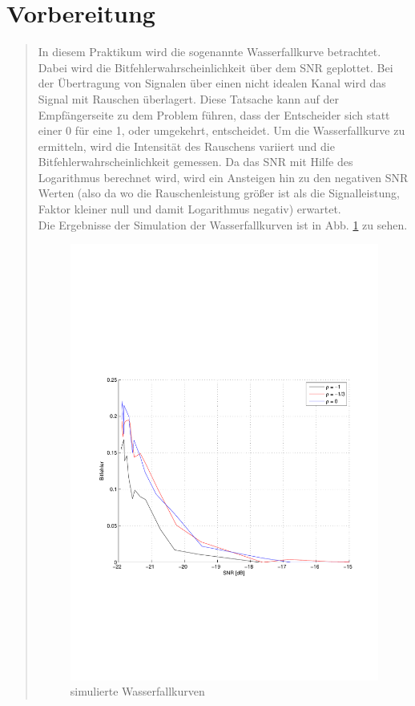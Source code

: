 \section{Vorbereitung}
\begin{quote}
       In diesem Praktikum wird die sogenannte Wasserfallkurve betrachtet. Dabei wird die Bitfehlerwahrscheinlichkeit
       über dem SNR geplottet. Bei der Übertragung von Signalen über einen nicht idealen Kanal wird das Signal mit
       Rauschen überlagert. Diese Tatsache kann auf der Empfängerseite zu dem Problem führen, dass der Entscheider sich
       statt einer 0 für eine 1, oder umgekehrt, entscheidet. Um die Wasserfallkurve zu ermitteln, wird die
       Intensität des Rauschens variiert und die Bitfehlerwahrscheinlichkeit gemessen.
       Da das SNR mit Hilfe des Logarithmus berechnet wird, wird ein Ansteigen hin zu den negativen SNR Werten (also da wo die Rauschenleistung größer ist als die Signalleistung, Faktor kleiner null und damit Logarithmus
       negativ) erwartet. \\
       Die Ergebnisse der Simulation der Wasserfallkurven ist in Abb. \ref{fig:simu_Wasser} zu sehen.
  
       \begin{figure}[H]
        \centering
        \includegraphics[scale=0.7, trim = 2cm 7cm 1cm 8cm, clip]{Bilder/Simulation_Wasserfall}
          \caption{simulierte Wasserfallkurven}
        \label{fig:simu_Wasser}
       \end{figure}
       

\end{quote}
